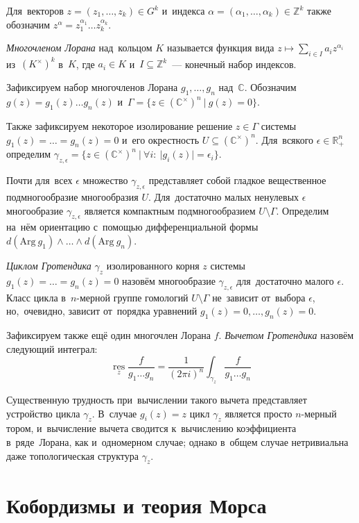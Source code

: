 \documentclass{article}
\begin{document}
Для~векторов $z = (z_1, \ldots, z_k) \in G^k$ и~индекса $\alpha = (\alpha_1, \ldots, \alpha_k) \in \mathbb{Z}^k$
также обозначим $z^\alpha = z_1^{\alpha_1} \ldots z_k^{\alpha_k}$.

\textit{Многочленом Лорана} над~кольцом $K$ называется функция вида $z \mapsto \sum_{i \in I} a_i z^{\alpha_i}$ из~$(K^\times)^k$ в~$K$,
где $a_i \in K$ и~$I \subseteq \mathbb{Z}^k$~— конечный набор индексов.

Зафиксируем набор многочленов Лорана $g_1, \ldots, g_n$ над~$\mathbb{C}$.
Обозначим $g(z) = g_1(z) \ldots g_n(z)$ и~$\Gamma = \{ z \in (\mathbb{C}^\times)^n \ | \ g(z) = 0 \}$.

Также зафиксируем некоторое изолирование решение $z \in \Gamma$ системы $g_1(z) = \ldots = g_n(z) = 0$ и~его окрестность $U \subseteq (\mathbb{C}^\times)^n$.
Для~всякого $\epsilon \in \mathbb{R}_{+}^n$ определим $\gamma_{z, \epsilon} = \{ z \in (\mathbb{C}^\times)^n\ | \ \forall i{:}\ |g_i(z)| = \epsilon_i \}$.

Почти для~всех $\epsilon$ множество $\gamma_{z, \epsilon}$ представляет собой гладкое вещественное подмногообразие многообразия $U$.
Для~достаточно малых ненулевых $\epsilon$ многообразие $\gamma_{z, \epsilon}$ является компактным подмногообразием $U \setminus \Gamma$.
Определим на~нём ориентацию с~помощью дифференциальной формы $d(\mathrm{Arg}\ g_1) \wedge \ldots \wedge d(\mathrm{Arg}\ g_n)$.

\textit{Циклом Гротендика} $\gamma_z$ \cite{GelKho02} изолированного корня $z$ системы $g_1(z) = \ldots = g_n(z) = 0$ назовём многообразие $\gamma_{z, \epsilon}$ для~достаточно малого $\epsilon$.
Класс цикла в~$n$-мерной группе гомологий $U \setminus \Gamma$ не~зависит от~выбора $\epsilon$, но,~очевидно, зависит от~порядка уравнений $g_1(z) = 0, \ldots, g_n(z) = 0$.

Зафиксируем также ещё один многочлен Лорана $f$. \textit{Вычетом Гротендика} назовём следующий интеграл:
$$
  \operatorname*{res}\limits_{z} \frac{f}{g_1 \ldots g_n} = \frac{1}{(2 \pi i)^n} \int_{\gamma_z} \frac{f}{g_1 \ldots g_n}
$$

Существенную трудность при~вычислении такого вычета представляет устройство цикла $\gamma_z$.
В~случае $g_i(z) = z$ цикл $\gamma_z$ является просто $n$-мерный тором, и~вычисление вычета
сводится к~вычислению коэффициента в~ряде~Лорана, как и~одномерном случае; однако в~общем случае
нетривиальна даже топологическая структура $\gamma_z$.

\section{Кобордизмы и теория Морса}
\end{document}
